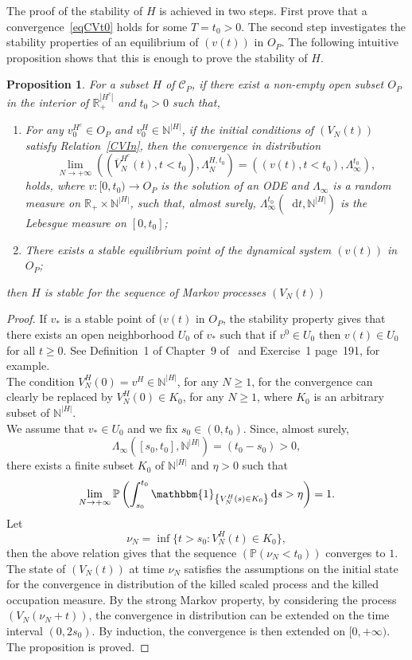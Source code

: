 \documentclass[english]{amsart}
\newcommand{\N}{\ensuremath{\mathbb{N}}}
\newcommand{\R}{\ensuremath{\mathbb{R}}}
\renewcommand{\P}{\ensuremath{\mathbb{P}}}
\newcommand{\ind}[1]{\ensuremath{\mathbbm{1}_{\left\{#1\right\}}}}
\newcommand{\diff}{\mathop{}\mathopen{}\mathrm{d}}
\newcommand{\cal}[1]{\ensuremath{\mathcal{#1}}}
\newtheorem{proposition}{Proposition}
\numberwithin{proposition}{section}
\begin{document}
The proof of the stability of $H$ is achieved in two steps. First prove that a convergence~\eqref{eqCVt0} holds for some $T{=}t_0{>}0$. The second step investigates the stability properties of an equilibrium of $(v(t))$ in $O_P$. The following intuitive proposition shows that this is enough to prove the stability of $H$. 
\begin{proposition}\label{StabProp}
For a subset $H$ of  ${\cal C}_P$, if there exist a non-empty open subset $O_P$ in the interior of $\R_+^{|H^c|}$ and $t_0{>}0$  such that,
  \begin{enumerate}
    \item For any $v_0^{H^c}{\in}O_P$ and $v^H_0{\in}\N^{|H|}$, if the initial conditions of $(V_N(t))$ satisfy Relation~\eqref{CVIn}, then the convergence in distribution 
\[
\lim_{N\to+\infty}  \left(\left(\overline{V}^{H^c}_{N}(t),t{<}t_0\right), \Lambda^{H,t_0}_{N}\right)=((v(t),t<t_0), \Lambda^{t_0}_\infty),
\]
holds, where $v{:}[0,t_0){\to}O_P$ is the solution of an ODE and  $\Lambda_\infty$ is a random measure on $\R_+{\times}\N^{|H|}$, such that, almost surely,  $\Lambda^{t_0}_{\infty}(\diff t, \N^{|H|})$ is the Lebesgue measure on $[0,t_0]$;
\item There exists a {\em stable} equilibrium point of the dynamical system $(v(t))$ in $O_P$;
  \end{enumerate}
then $H$ is stable for the sequence of Markov processes $(V_N(t))$
\end{proposition}
\begin{proof}
If $v_*$ is a stable point of $(v(t)$ in $O_P$, the stability property gives that  there exists an open neighborhood $U_0$ of $v_*$ such that if $v^0{\in}U_0$ then $v(t){\in}U_0$ for all $t{\ge}0$. See Definition~1 of Chapter~9 of~\citet{Hirsch} and Exercise~1 page~191, for example. \\
The condition $V^H_{N}(0){=}v^H{\in}\N^{|H|}$, for any $N{\ge}1$, for the convergence can clearly be  replaced by   $V^H_{N}(0){\in}K_0$, for any $N{\ge}1$, where $K_0$ is an arbitrary subset of $\N^{|H|}$.\\
We assume that $v_*{\in}U_0$ and we fix $s_0{\in}(0,t_0)$. Since, almost surely,
\[
\Lambda_\infty([s_0,t_0],\N^{|H|}){=}(t_0{-}s_0){>}0,
\]
there exists a finite subset $K_0$ of $\N^{|H|}$ and $\eta{>}0$ such that 
\[
\lim_{N\to+\infty} \P\left(\int_{s_0}^{t_0}\ind{V_N^{H}(s){\in}K_0}\diff s  > \eta\right)=1.
\]
Let
\[
\nu_N=\inf\{t>s_0: V^H_{N}(t){\in} K_0\},
\]
then the above relation gives that the sequence $(\P(\nu_N{<}t_0))$ converges to $1$. The state of $(V_N(t))$ at time $\nu_N$ satisfies the assumptions on the initial state for the convergence in distribution of the killed scaled process and the killed occupation measure. By the strong Markov property, by considering the process $(V_N(\nu_N{+}t))$, the convergence in distribution can be extended on the time interval $(0,2s_0)$. By induction, the convergence is then extended on $[0,{+}\infty)$. The proposition is proved. 
\end{proof}
\end{document}
